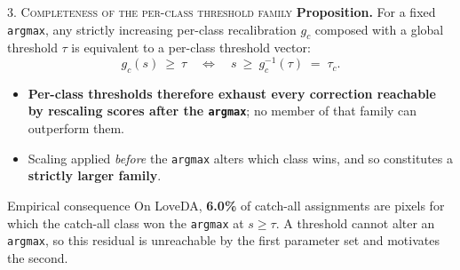 \documentclass[aspectratio=169]{beamer}
\newcommand{\best}[1]{\textcolor{acc}{\textbf{#1}}}
\begin{document}
\begin{frame}{\textsc{3. Completeness of the per-class threshold family}}
\small
\textbf{Proposition.} For a fixed \texttt{argmax}, any strictly increasing
per-class recalibration $g_c$ composed with a global threshold $\tau$ is
equivalent to a per-class threshold vector:
\[
  g_c(s)\ \ge\ \tau \quad\Longleftrightarrow\quad s\ \ge\ g_c^{-1}(\tau)\;=\;\tau_c .
\]
\begin{itemize}
  \item \best{Per-class thresholds therefore exhaust every correction reachable
        by rescaling scores after the \texttt{argmax}}; no member of that family
        can outperform them.
  \item Scaling applied \emph{before} the \texttt{argmax} alters which class
        wins, and so constitutes a \best{strictly larger family}.
\end{itemize}
\vspace{0.4em}
\begin{block}{Empirical consequence}
On LoveDA, \best{6.0\%} of catch-all assignments are pixels for which the
catch-all class won the \texttt{argmax} at $s \ge \tau$. A threshold cannot alter
an \texttt{argmax}, so this residual is unreachable by the first parameter set
and motivates the second.
\end{block}
\end{frame}

\end{document}
